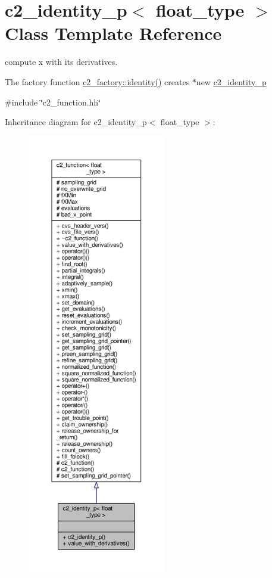 \hypertarget{classc2__identity__p}{}\section{c2\+\_\+identity\+\_\+p$<$ float\+\_\+type $>$ Class Template Reference}
\label{classc2__identity__p}


compute x with its derivatives.

The factory function \hyperlink{classc2__factory_a66970667d203c0e63a016b08d2472dc4}{c2\+\_\+factory\+::identity()} creates $\ast$new \hyperlink{classc2__identity__p}{c2\+\_\+identity\+\_\+p}  




{\ttfamily \#include \char`\"{}c2\+\_\+function.\+hh\char`\"{}}



Inheritance diagram for c2\+\_\+identity\+\_\+p$<$ float\+\_\+type $>$\+:
\nopagebreak
\begin{figure}[H]
\begin{center}
\leavevmode
\includegraphics[height=550pt]{classc2__identity__p__inherit__graph}
\end{center}
\end{figure}


